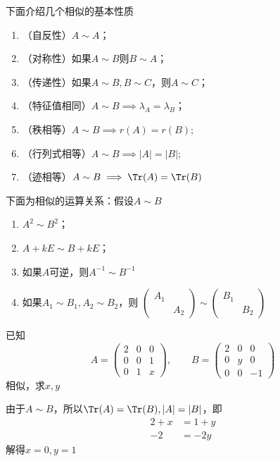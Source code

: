 下面介绍几个相似的基本性质
\begin{enumerate}[(1)]
    \item （自反性）$A\sim A$；
    \item （对称性）如果$A\sim B$则$B \sim A$；
    \item （传递性）如果$A\sim B, B \sim C$，则$A\sim C$；
    \item （特征值相同）$A\sim B \implies \lambda_A = \lambda_B$；
    \item （秩相等）$A\sim B \implies r(A)=r(B)$;
    \item （行列式相等）$A\sim B \implies |A|=|B|$;
    \item （迹相等）$A\sim B \implies \Tr(A) = \Tr(B)$
\end{enumerate}

下面为相似的运算关系：假设$A\sim B$
\begin{enumerate}[(1)]
    \item $A^2 \sim B^2$；
    \item $A+kE \sim B + kE$；
    \item 如果$A$可逆，则$A^{-1}\sim B^{-1}$
    \item 如果$A_1\sim B_1, A_2\sim B_2$，则
          $
              \begin{pmatrix}
                  A_1 &     \\
                      & A_2
              \end{pmatrix}
              \sim
              \begin{pmatrix}
                  B_1 &     \\
                      & B_2
              \end{pmatrix}
          $
\end{enumerate}

\begin{example}
    已知
    \[
        A =
        \begin{pmatrix}
            2 & 0 & 0 \\
            0 & 0 & 1 \\
            0 & 1 & x
        \end{pmatrix}
        ,\qquad
        B =
        \begin{pmatrix}
            2 & 0 & 0  \\
            0 & y & 0  \\
            0 & 0 & -1
        \end{pmatrix}
    \]
    相似，求$x,y$
\end{example}
\begin{solution}
    由于$A\sim B$，所以$\Tr(A)=\Tr(B),|A|=|B|$，即
    \begin{align*}
        2+x & = 1+y \\
        -2  & = -2y
    \end{align*}
    解得$x=0,y=1$
\end{solution}

